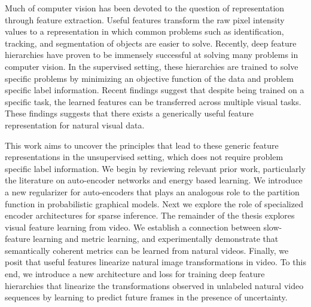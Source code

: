 Much of computer vision has been devoted to the question of representation
through feature extraction. Useful features transform the raw pixel intensity
values to a representation in which common problems such as identification,
tracking, and segmentation of objects are easier to solve. Recently, deep
feature hierarchies have proven to be immensely successful at solving many
problems in computer vision. In the supervised setting, these hierarchies are
trained to solve specific problems by minimizing an objective function of the
data and problem specific label information. Recent findings suggest that
despite being trained on a specific task, the learned features can be
transferred across multiple visual tasks. These findings suggests that there
exists a generically useful feature representation for natural visual data.    

This work aims to uncover the principles that lead to these generic feature
representations in the unsupervised setting, which does not require problem
specific label information. We begin by reviewing relevant prior work,
particularly the literature on auto-encoder networks and energy based learning.
We introduce a new regularizer for auto-encoders that plays an analogous role
to the partition function in probabilistic graphical models.  Next we explore
the role of specialized encoder architectures for sparse inference. The
remainder of the thesis explores visual feature learning from video. We
establish a connection between slow-feature learning and metric learning, and
experimentally demonstrate that semantically coherent metrics can be learned
from natural videos. Finally, we posit that useful features linearize
natural image transformations in video. To this end, we introduce a new
architecture and loss for training deep feature hierarchies that linearize the
transformations observed in unlabeled natural video sequences by learning to
predict future frames in the presence of uncertainty.           


 
